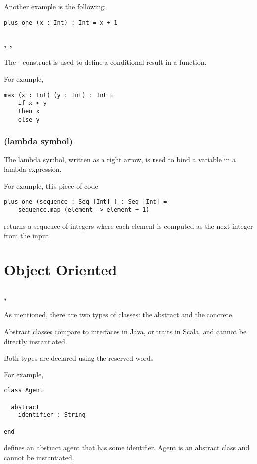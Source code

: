 Another example is the following:
\begin{lstlisting}[label={lst:exampleType02}]
  plus_one (x : Int) : Int = x + 1
\end{lstlisting}

\subsubsection{\sodaif, \sodathen, \sodaelse}

The \sodaif-\sodathen-\sodaelse construct is used to define a conditional result in a function.

For example,
\begin{lstlisting}[label={lst:exampleIfThenElse}]
  max (x : Int) (y : Int) : Int =
    if x > y
    then x
    else y
\end{lstlisting}

\subsubsection{\sodaarrow (lambda symbol)}

The lambda symbol, written as a right arrow, is used to bind a variable in a lambda expression.

For example, this piece of code
\begin{lstlisting}[label={lst:exampleLambda}]
  plus_one (sequence : Seq [Int] ) : Seq [Int] =
    sequence.map (element -> element + 1)
\end{lstlisting}
returns a sequence of integers where each element is computed as the next integer from the input


\section{Object Oriented}

\subsubsection{\sodaclass, \sodaabstract}

As mentioned, there are two types of classes: the abstract and the concrete.

Abstract classes compare to interfaces in Java, or traits in Scala, and cannot be directly instantiated.

Both types are declared using the \sodaclass reserved words.

For example,
\begin{lstlisting}[label={lst:exampleAbstractClass}]
class Agent

  abstract
    identifier : String

end
\end{lstlisting}
defines an abstract agent that has some identifier.
Agent is an abstract class and cannot be instantiated.


